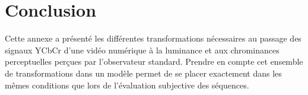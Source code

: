 
\section{Conclusion}
Cette annexe a présenté les différentes transformations nécessaires au passage des signaux YCbCr d'une vidéo numérique à la luminance et aux chrominances perceptuelles perçues par l'observateur standard. Prendre en compte cet ensemble de transformations dans un modèle permet de se placer exactement dans les mêmes conditions que lors de l'évaluation subjective des séquences.


\ornementChapitre
